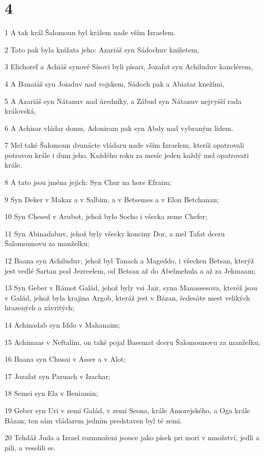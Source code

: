\chapter{4}

\par 1 A tak král Šalomoun byl králem nade vším Izraelem.
\par 2 Tato pak byla knížata jeho: Azariáš syn Sádochuv knížetem,
\par 3 Elichoref a Achiáš synové Sísovi byli písari, Jozafat syn Achiluduv kanclérem,
\par 4 A Banaiáš syn Joiaduv nad vojskem, Sádoch pak a Abiatar knežími,
\par 5 A Azariáš syn Nátanuv nad úredníky, a Zábud syn Nátanuv nejvyšší rada královská,
\par 6 A Achisar vládar domu, Adoniram pak syn Abdy nad vybraným lidem.
\par 7 Mel také Šalomoun dvanácte vládaru nade vším Izraelem, kteríž opatrovali potravou krále i dum jeho. Každého roku za mesíc jeden každý mel opatrovati krále.
\par 8 A tato jsou jména jejich: Syn Chur na hore Efraim;
\par 9 Syn Deker v Makaz a v Salbim, a v Betsemes a v Elon Betchanan;
\par 10 Syn Chesed v Arubot, jehož bylo Socho i všecka zeme Chefer;
\par 11 Syn Abinadabuv, jehož byly všecky konciny Dor, a mel Tafat dceru Šalomounovu za manželku;
\par 12 Baana syn Achiluduv, jehož byl Tanach a Mageddo, i všecken Betsan, kterýž jest vedlé Sartan pod Jezreelem, od Betsan až do Abelmehula a až za Jekmaam;
\par 13 Syn Geber v Rámot Galád, jehož byly vsi Jair, syna Manassesova, kteréž jsou v Galád, jehož byla krajina Argob, kteráž jest v Bázan, šedesáte mest velikých hrazených a závritých;
\par 14 Achinadab syn Iddo v Mahanaim;
\par 15 Achimaas v Neftalím, on také pojal Basemat dceru Šalomounovu za manželku;
\par 16 Baana syn Chusai v Asser a v Alot;
\par 17 Jozafat syn Paruach v Izachar;
\par 18 Semei syn Ela v Beniamin;
\par 19 Geber syn Uri v zemi Galád, v zemi Seona, krále Amorejského, a Oga krále Bázan; ten sám vládarem jedním predstaven byl té zemi.
\par 20 Tehdáž Juda a Izrael rozmnoženi jsouce jako písek pri mori v množství, jedli a pili, a veselili se.
